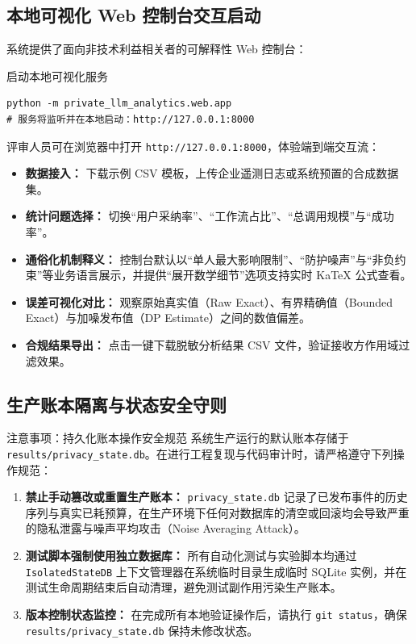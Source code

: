 \subsection{本地可视化 Web 控制台交互启动}

系统提供了面向非技术利益相关者的可解释性 Web 控制台：

\begin{techbox}{启动本地可视化服务}
\begin{verbatim}
python -m private_llm_analytics.web.app
# 服务将监听并在本地启动：http://127.0.0.1:8000
\end{verbatim}
\end{techbox}

评审人员可在浏览器中打开 \texttt{http://127.0.0.1:8000}，体验端到端交互流：
\begin{itemize}[itemsep=1pt,topsep=2pt]
  \item \textbf{数据接入：} 下载示例 CSV 模板，上传企业遥测日志或系统预置的合成数据集。
  \item \textbf{统计问题选择：} 切换“用户采纳率”、“工作流占比”、“总调用规模”与“成功率”。
  \item \textbf{通俗化机制释义：} 控制台默认以“单人最大影响限制”、“防护噪声”与“非负约束”等业务语言展示，并提供“展开数学细节”选项支持实时 KaTeX 公式查看。
  \item \textbf{误差可视化对比：} 观察原始真实值（Raw Exact）、有界精确值（Bounded Exact）与加噪发布值（DP Estimate）之间的数值偏差。
  \item \textbf{合规结果导出：} 点击一键下载脱敏分析结果 CSV 文件，验证接收方作用域过滤效果。
\end{itemize}

\subsection{生产账本隔离与状态安全守则}

\begin{techbox}[colback=white,colframe=accentamber]{注意事项：持久化账本操作安全规范}
系统生产运行的默认账本存储于 \texttt{results/privacy\_state.db}。在进行工程复现与代码审计时，请严格遵守下列操作规范：
\begin{enumerate}[itemsep=1pt,topsep=1pt]
  \item \textbf{禁止手动篡改或重置生产账本：} \texttt{privacy\_state.db} 记录了已发布事件的历史序列与真实已耗预算，在生产环境下任何对数据库的清空或回滚均会导致严重的隐私泄露与噪声平均攻击（Noise Averaging Attack）。
  \item \textbf{测试脚本强制使用独立数据库：} 所有自动化测试与实验脚本均通过 \texttt{IsolatedStateDB} 上下文管理器在系统临时目录生成临时 SQLite 实例，并在测试生命周期结束后自动清理，避免测试副作用污染生产账本。
  \item \textbf{版本控制状态监控：} 在完成所有本地验证操作后，请执行 \texttt{git status}，确保 \texttt{results/privacy\_state.db} 保持未修改状态。
\end{enumerate}
\end{techbox}

